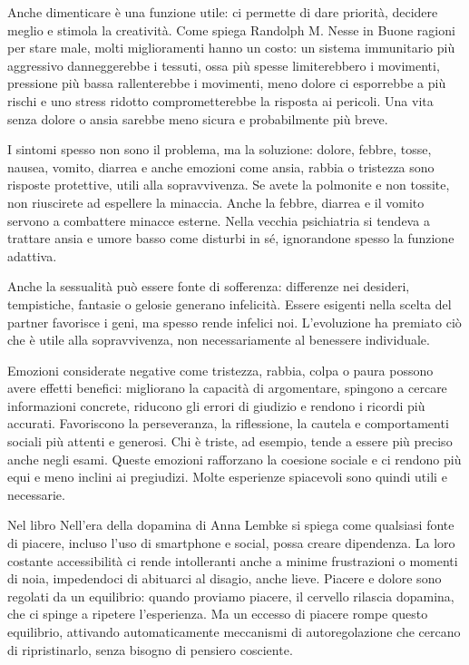 \documentclass[12pt]{book} %
\begin{document}
\begin{mdframed}[linewidth=1pt]
Anche dimenticare è una funzione utile: ci permette di dare priorità, decidere meglio e stimola la creatività. Come spiega Randolph M. Nesse in Buone ragioni per stare male, molti miglioramenti hanno un costo: un sistema immunitario più aggressivo danneggerebbe i tessuti, ossa più spesse limiterebbero i movimenti, pressione più bassa rallenterebbe i movimenti, meno dolore ci esporrebbe a più rischi e uno stress ridotto comprometterebbe la risposta ai pericoli. Una vita senza dolore o ansia sarebbe meno sicura e probabilmente più breve.

I sintomi spesso non sono il problema, ma la soluzione: dolore, febbre, tosse, nausea, vomito, diarrea e anche emozioni come ansia, rabbia o tristezza sono risposte protettive, utili alla sopravvivenza. Se avete la polmonite e non tossite, non riuscirete ad espellere la minaccia. Anche la febbre, diarrea e il vomito servono a combattere minacce esterne. Nella vecchia psichiatria si tendeva a trattare ansia e umore basso come disturbi in sé, ignorandone spesso la funzione adattiva.

Anche la sessualità può essere fonte di sofferenza: differenze nei desideri, tempistiche, fantasie o gelosie generano infelicità. Essere esigenti nella scelta del partner favorisce i geni, ma spesso rende infelici noi. L’evoluzione ha premiato ciò che è utile alla sopravvivenza, non necessariamente al benessere individuale.

Emozioni considerate negative come tristezza, rabbia, colpa o paura possono avere effetti benefici: migliorano la capacità di argomentare, spingono a cercare informazioni concrete, riducono gli errori di giudizio e rendono i ricordi più accurati. Favoriscono la perseveranza, la riflessione, la cautela e comportamenti sociali più attenti e generosi. Chi è triste, ad esempio, tende a essere più preciso anche negli esami. Queste emozioni rafforzano la coesione sociale e ci rendono più equi e meno inclini ai pregiudizi. Molte esperienze spiacevoli sono quindi utili e necessarie.

Nel libro Nell'era della dopamina di Anna Lembke si spiega come qualsiasi fonte di piacere, incluso l’uso di smartphone e social, possa creare dipendenza. La loro costante accessibilità ci rende intolleranti anche a minime frustrazioni o momenti di noia, impedendoci di abituarci al disagio, anche lieve. Piacere e dolore sono regolati da un equilibrio: quando proviamo piacere, il cervello rilascia dopamina, che ci spinge a ripetere l’esperienza. Ma un eccesso di piacere rompe questo equilibrio, attivando automaticamente meccanismi di autoregolazione che cercano di ripristinarlo, senza bisogno di pensiero cosciente.


\end{mdframed}
\end{document}

